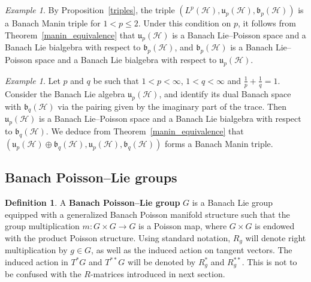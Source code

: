 \documentclass[a4paper,12pt,reqno]{amsart}%
\theoremstyle{definition}
\newtheorem{definition}[theorem]{Definition}
\theoremstyle{remark}
\newtheorem{example}[theorem]{Example}
\numberwithin{theorem}{section}
\numberwithin{equation}{section}
\newcommand{\1}{{\bf 1}}
\begin{document}
\begin{example}{\rm
By Proposition~\ref{triples}, the triple $\left(L^p(\mathcal{H}), \mathfrak{u}_p(\mathcal{H}), \mathfrak{b}_p(\mathcal{H})\right)$ is a Banach Manin triple for $1<p\leq 2$. Under this condition on $p$, it follows from Theorem~\ref{manin_equivalence} that $\mathfrak{u}_p(\mathcal{H})$ is a Banach Lie--Poisson space and a Banach Lie bialgebra with respect to $\mathfrak{b}_p(\mathcal{H})$, and $\mathfrak{b}_p(\mathcal{H})$ is a Banach Lie--Poisson space and a Banach Lie bialgebra with respect to $\mathfrak{u}_p(\mathcal{H})$.}
\end{example}

\begin{example}\label{Iwasawa_Banach_Lie_bialgebra}{\rm 
Let $p$ and $q$ be such that $1<p<\infty$, $1<q<\infty$ and $\frac{1}{p}+\frac{1}{q} = 1$.
Consider the Banach Lie algebra $\mathfrak{u}_p(\mathcal{H})$, and identify its dual Banach space with $\mathfrak{b}_q(\mathcal{H})$ via the pairing given by the imaginary part of the trace. Then  $\mathfrak{u}_p(\mathcal{H})$ is a Banach Lie--Poisson space and a Banach Lie bialgebra with respect to $\mathfrak{b}_q(\mathcal{H})$. We deduce from Theorem~\ref{manin_equivalence} that $\left(\mathfrak{u}_p(\mathcal{H})\oplus \mathfrak{b}_{q}(\mathcal{H}), \mathfrak{u}_p(\mathcal{H}), \mathfrak{b}_{q}(\mathcal{H})\right) $ forms a Banach Manin triple.}
\end{example}




\subsection{Banach Poisson--Lie groups}\label{sec:BPLG}

\begin{definition}
A \textbf{Banach Poisson--Lie group} $G$ is a Banach Lie group  equipped with a generalized Banach Poisson manifold structure such that the group multiplication $m: G \times G \rightarrow G$ is a Poisson map, where $G \times G$ is endowed with the product Poisson structure. Using standard notation, $R_g$ will denote right multiplication by $g\in G$, as well as the induced action on tangent vectors. The induced action in $T^*G$ and $T^{**}G$ will be denoted by $R_g^*$ and $R_g^{**}$. This is not to be confused with the $R$-matrices introduced in next section.
\end{definition}
\end{document}
